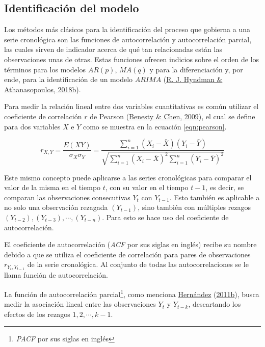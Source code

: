 \documentclass[
]{article}
\begin{document}
\subsection{Identificación del modelo}

Los métodos más clásicos para la identificación del proceso que gobierna
a una serie cronológica son las funciones de autocorrelación y
autocorrelación parcial, las cuales sirven de indicador acerca de qué
tan relacionadas están las observaciones unas de otras. Estas funciones
ofrecen indicios sobre el orden de los términos para los modelos
\(AR(p)\), \(MA(q)\) y para la diferenciación y, por ende, para la
identificación de un modelo \(ARIMA\)
(\protect\hyperlink{ref-hyndman_box-jenkins}{R. J. Hyndman \&
Athanasopoulos, 2018b}).

Para medir la relación lineal entre dos variables cuantitativas es común
utilizar el coeficiente de correlación \(r\) de Pearson
(\protect\hyperlink{ref-pearson}{Benesty \& Chen, 2009}), el cual se
define para dos variables \(X\) e \(Y\) como se muestra en la ecuación
\ref{eqn:pearson}.

\begin{equation}
\label{eqn:pearson}
r_{X,Y}=\frac{E(XY)}{\sigma_X \sigma_Y} = \frac{\sum_{i=1}^n \left(X_i- \bar X\right) \left(Y_i- \bar Y\right)}{\sqrt{\sum_{i=1}^n \left(X_i- \bar X\right)^2 \sum_{i=1}^n \left(Y_i- \bar Y\right)^2}}
\end{equation}

Este mismo concepto puede aplicarse a las series cronológicas para
comparar el valor de la misma en el tiempo \(t\), con su valor en el
tiempo \(t-1\), es decir, se comparan las observaciones consecutivas
\(Y_t\) con \(Y_{t-1}\). Esto también es aplicable a no solo una
observación rezagada \((Y_{t-1})\), sino también con múltiples rezagos
\((Y_{t-2}), (Y_{t-3}), \cdots,(Y_{t-n})\). Para esto se hace uso del
coeficiente de autocorrelación.

El coeficiente de autocorrelación (\emph{ACF} por sus siglas en inglés)
recibe su nombre debido a que se utiliza el coeficiente de correlación
para pares de observaciones \(r_{Y_t, Y_{t-1}}\) de la serie
cronológica. Al conjunto de todas las autocorrelaciones se le llama
función de autocorrelación.

La función de autocorrelación parcial\footnote{\emph{PACF} por sus
  siglas en inglés}, como menciona
\protect\hyperlink{ref-oscarh-4}{Hernández}
(\protect\hyperlink{ref-oscarh-4}{2011b}), busca medir la asociación
lineal entre las observaciones \(Y_t\) y \(Y_{t-k}\), descartando los
efectos de los rezagos \(1,2, \cdots ,k-1\).
\end{document}
